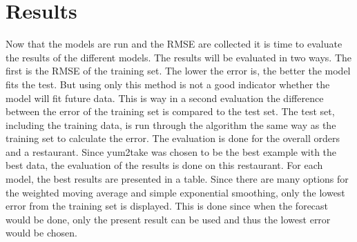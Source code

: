 \chapter{Results}\label{chapter:Results}
Now that the models are run and the RMSE are collected it is time to evaluate the results of the different models. The results will be evaluated in two ways. The first is the RMSE of the training set. The lower the error is, the better the model fits the test. But using only this method is not a good indicator whether the model will fit future data. This is way in a second evaluation the difference between the error of the training set is compared to the test set. The test set, including the training data, is run through the algorithm the same way as the training set to calculate the error.
The evaluation is done for the overall orders and a restaurant. Since yum2take was chosen to be the best example with the best data, the evaluation of the results is done on this restaurant.\newline
For each model, the best results are presented in a table. Since there are many options for the weighted moving average and simple exponential smoothing, only the lowest error from the training set is displayed. This is done since when the forecast would be done, only the present result can be used and thus the lowest error would be chosen.
